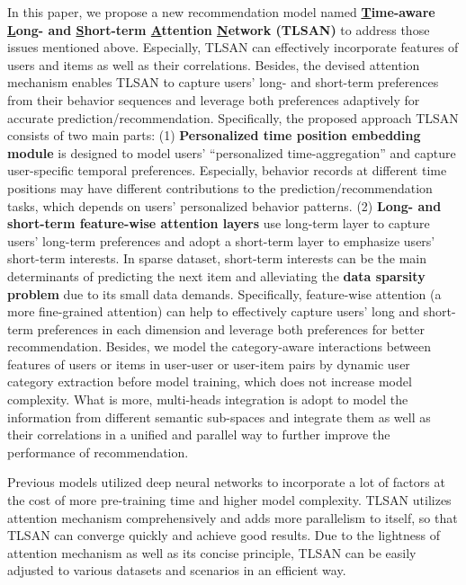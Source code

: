 \documentclass[preprint,12pt]{elsarticle}
\newcommand{\tool}{TLSAN\xspace}
\begin{document}
\begin{sloppypar}
In this paper, we propose a new recommendation model named \textbf{\underline{T}ime-aware \underline{L}ong- and \underline{S}hort-term \underline{A}ttention \underline{N}etwork (\tool)} to address those issues mentioned above.
Especially, \tool can effectively incorporate features of users and items as well as their correlations. Besides, the devised attention mechanism enables \tool to capture users' long- and short-term preferences from their behavior sequences and leverage both preferences adaptively for accurate prediction/recommendation. 
Specifically, the proposed approach \tool consists of two main parts: 
(1) \textbf{Personalized time position embedding module} is designed to model users' ``personalized time-aggregation'' and capture user-specific temporal preferences. Especially, behavior records at different time positions may have different contributions to the prediction/recommendation tasks, which depends on users' personalized behavior patterns.
(2) \textbf{Long- and short-term feature-wise attention layers} use long-term layer to capture users' long-term preferences and adopt a short-term layer to emphasize users' short-term interests. In sparse dataset, short-term interests can be the main determinants of predicting the next item and alleviating the \textbf{data sparsity problem} due to its small data demands. Specifically, feature-wise attention (a more fine-grained attention) can help to effectively capture users' long and short-term preferences in each dimension and leverage both preferences for better recommendation. Besides, we model the category-aware interactions between features of users or items in user-user or user-item pairs by dynamic user category extraction before model training, which does not increase model complexity. What is more, multi-heads integration is adopt to model the information from different semantic sub-spaces and integrate them as well as their correlations in a unified and parallel way to further improve the performance of recommendation.

Previous models utilized deep neural networks to incorporate a lot of factors at the cost of more pre-training time and higher model complexity. \tool utilizes attention mechanism comprehensively and adds more parallelism to itself, so that \tool can converge quickly and achieve good results. Due to the lightness of attention mechanism as well as its concise principle, \tool can be easily adjusted to various datasets and scenarios in an efficient way.


\end{sloppypar}
\end{document}
